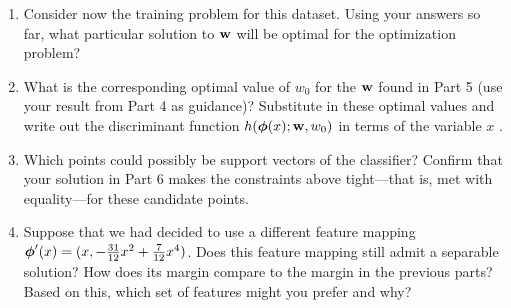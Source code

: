 \documentclass[submit]{harvardml}
\begin{document}
\begin{problem}
\begin{enumerate}
\item Consider now the training problem for this dataset. Using your
  answers so far, what particular solution to $\mathbf{w}$ will be optimal
  for the optimization problem?

\item What is the corresponding optimal value of $w_0$ for the
  $\mathbf{w}$ found in Part 5 (use your result from Part 4 as guidance)?
  Substitute in these optimal values and write out the discriminant
  function $h(\boldsymbol{\phi}(x);\mathbf{w},w_0)$ in terms of the variable $x$ .


\item Which points could possibly be support vectors of the classifier?  Confirm that
  your solution in Part 6 makes the constraints above tight---that is,
  met with equality---for these candidate points.

\item Suppose that we had decided to use a different feature mapping
    $\boldsymbol{\phi}'(x) = (x, -\frac{31}{12}x^2 + \frac{7}{12}x^4 )$.  Does
    this feature mapping still admit a separable solution?  How does
    its margin compare to the margin in the previous parts?  Based on
    this, which set of features might you prefer and why? 
    
\end{enumerate}

\end{problem}

\newpage
\end{document}
